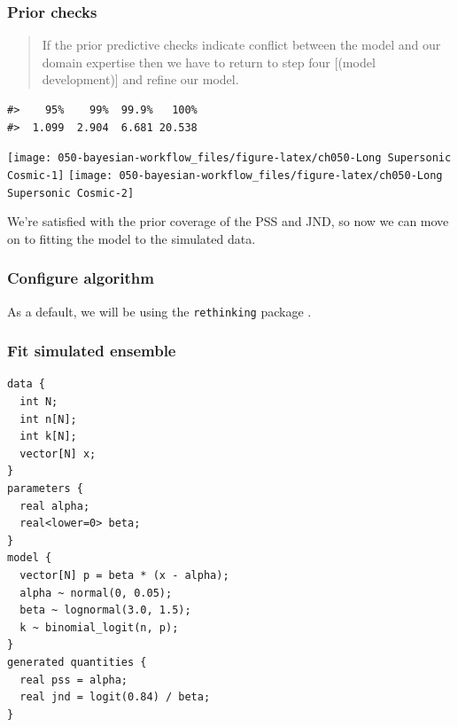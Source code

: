 \documentclass[11pt, oneside, openany]{scrbook}
\begin{document}

\hypertarget{iter1-prior-check}{%
\subsubsection{Prior checks}\label{iter1-prior-check}}

\begin{quote}
If the prior predictive checks indicate conflict between the model and our domain expertise then we have to return to step four {[}(model development){]} and refine our model.
\end{quote}

\begin{verbatim}
#>    95%    99%  99.9%   100% 
#>  1.099  2.904  6.681 20.538
\end{verbatim}

\begin{center}\texttt{[image: 050-bayesian-workflow\_files/figure-latex/ch050-Long Supersonic Cosmic-1]} \texttt{[image: 050-bayesian-workflow\_files/figure-latex/ch050-Long Supersonic Cosmic-2]} \end{center}

We're satisfied with the prior coverage of the PSS and JND, so now we can move on to fitting the model to the simulated data.

\hypertarget{iter1-config-algo}{%
\subsubsection{Configure algorithm}\label{iter1-config-algo}}

As a default, we will be using the \texttt{rethinking} package \citep{rethinking}.

\hypertarget{iter1-fit-sim}{%
\subsubsection{Fit simulated ensemble}\label{iter1-fit-sim}}


\begin{verbatim}
data {
  int N;
  int n[N];
  int k[N];
  vector[N] x;
}
parameters {
  real alpha;
  real<lower=0> beta;
}
model {
  vector[N] p = beta * (x - alpha);
  alpha ~ normal(0, 0.05);
  beta ~ lognormal(3.0, 1.5);
  k ~ binomial_logit(n, p);
}
generated quantities {
  real pss = alpha;
  real jnd = logit(0.84) / beta;
}
\end{verbatim}
\end{document}
